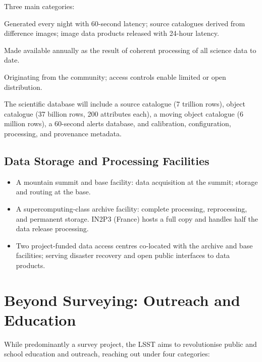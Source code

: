 \documentclass[12pt,a4paper]{article}
\begin{document}
Three main categories:

\begin{description}[leftmargin=*]
  \item[Prompt] Generated every night with 60-second latency; source
        catalogues derived from difference images; image data products
        released with 24-hour latency.
  \item[Data Releases] Made available annually as the result of coherent
        processing of all science data to date.
  \item[User Generated] Originating from the community; access controls
        enable limited or open distribution.
\end{description}

The scientific database will include a source catalogue (7 trillion rows),
object catalogue (37 billion rows, 200 attributes each), a moving object
catalogue (6 million rows), a 60-second alerts database, and calibration,
configuration, processing, and provenance metadata.

\subsection{Data Storage and Processing Facilities}

\begin{itemize}[leftmargin=*]
  \item A mountain summit and base facility: data acquisition at the summit;
        storage and routing at the base.
  \item A supercomputing-class archive facility: complete processing,
        reprocessing, and permanent storage. IN2P3 (France) hosts a full
        copy and handles half the data release processing.
  \item Two project-funded data access centres co-located with the archive
        and base facilities; serving disaster recovery and open public
        interfaces to data products.
\end{itemize}

\section{Beyond Surveying: Outreach and Education}

While predominantly a survey project, the LSST aims to revolutionise public
and school education and outreach, reaching out under four categories:
\end{document}
